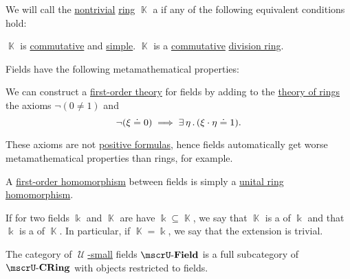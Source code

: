 \begin{definition}\label{def:field}
  We will call the \hyperref[def:ring/trivial]{nontrivial} \hyperref[def:ring]{ring} \( \BbbK \) a  if any of the following equivalent conditions hold:
  \begin{thmenum}
     \( \BbbK \) is \hyperref[def:ring/commutative]{commutative} and \hyperref[def:ring/simple]{simple}.
     \( \BbbK \) is a \hyperref[def:ring/commutative]{commutative} \hyperref[def:division_ring]{division ring}.
  \end{thmenum}

  Fields have the following metamathematical properties:
  \begin{thmenum}
     We can construct a \hyperref[def:first_order_theory]{first-order theory} for fields by adding to the \hyperref[def:semiring/theory]{theory of rings} the axioms \( \neg (0 \neq 1) \) and
    \begin{equation}\label{eq:def:field/theory/invertibility}
      \neg (\xi \doteq 0) \implies \exists \thinspace \eta \thinspace . \thinspace (\xi \cdot \eta \doteq 1).
    \end{equation}

    These axioms are not \hyperref[def:positive_formula]{positive formulas}, hence fields automatically get worse metamathematical properties than rings, for example.

     A \hyperref[def:first_order_homomorphism]{first-order homomorphism} between fields is simply a \hyperref[def:ring/homomorphism]{unital ring homomorphism}.

     If for two fields \( \Bbbk \) and \( \BbbK \) are have \( \Bbbk \subseteq \BbbK \), we say that \( \BbbK \) is a  of \( \Bbbk \) and that \( \Bbbk \) is a  of \( \BbbK \). In particular, if \( \BbbK = \Bbbk \), we say that the extension is trivial.

     The category of \hyperref[def:large_and_small_sets]{\( \mscrU \)-small} fields \( \ucat{Field} \) is a full subcategory of \hyperref[def:ring/category]{\( \ucat{CRing} \)} with objects restricted to fields.
  \end{thmenum}
\end{definition}
